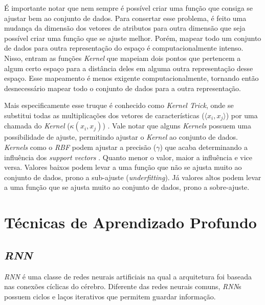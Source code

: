 É importante notar que nem sempre é possível criar uma função que consiga se ajustar bem ao conjunto de dados. Para consertar esse problema, é feito uma mudança da dimensão dos vetores de atributos para outra dimensão que seja possível criar uma função que se ajuste melhor. Porém, mapear todo um conjunto de dados para outra representação do espaço é computacionalmente intenso. Nisso, entram as funções \textit{Kernel} que mapeiam dois pontos que pertencem a algum certo espaço para a distância deles em alguma outra representação desse espaço. Esse mapeamento é menos exigente computacionalmente, tornando então desnecessário mapear todo o conjunto de dados para a outra representação. \cite{chollet2018deep}

Mais especificamente esse truque é conhecido como \textit{Kernel Trick}, onde se substitui todas as multiplicações dos vetores de características (\(\langle x_i, x_j \rangle\)) por uma chamada do \textit{Kernel} (\(\kappa(x_i, x_j)\)) \cite{murphy2012machine}. Vale notar que alguns \textit{Kernels} possuem uma possibilidade de ajuste, permitindo ajustar o \textit{Kernel} ao conjunto de dados. \textit{Kernels} como o \textit{\acrfull{RBF}} podem ajustar a precisão (\(\gamma\)) que acaba determinando a influência dos \textit{support vectors} \cite{murphy2012machine}. Quanto menor o valor, maior a influência e vice versa. Valores baixos podem levar a uma função que não se ajusta muito ao conjunto de dados, prono a sub-ajuste (\textit{underfitting}). Já valores altos podem levar a uma função que se ajusta muito ao conjunto de dados, prono a sobre-ajuste.

\section{Técnicas de Aprendizado Profundo}

\subsection{\textit{\acrfull{RNN}}}

\textit{\acrshort{RNN}} é uma classe de redes neurais artificiais na qual a arquitetura foi baseada nas conexões cíclicas do cérebro. Diferente das redes neurais comuns, \textit{\acrshort{RNN}}s possuem ciclos e laços iterativos que permitem guardar informação. \cite{alex2012} 

